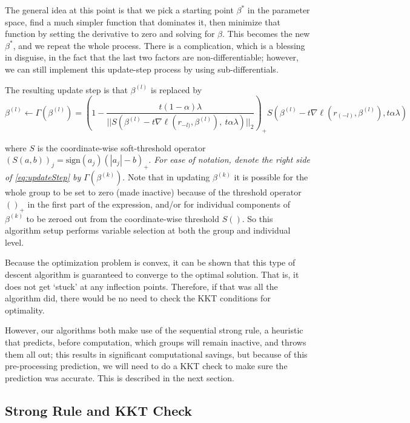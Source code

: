 \documentclass[titlepage]{article}
\begin{document}
The general idea at this point is that we pick a starting point $\beta^*$ in the parameter space, find a much simpler function that dominates it, then minimize that function by setting the derivative to zero and solving for $\beta$. This becomes the new $\beta^*$, and we repeat the whole process. There is a complication, which is a blessing in disguise, in the fact that the last two factors are non-differentiable; however, we can still implement this update-step process by using sub-differentials.



The resulting update step is that $\beta^{(l)}$ is replaced by
\begin{equation}
\beta^{(l)} \leftarrow \Gamma(\beta^{(l)}) =
\left(1-\frac{t(1-\alpha)\lambda}{||S(\beta^{(l)}-t\nabla \ell(r_{-l)},\beta^{(l)}),\ t\alpha\lambda)||_2}\right)_+ S(\beta^{(l)}-t\nabla \ell(r_{(-l)},\beta^{(l)}),t\alpha\lambda)
\label{eq:updateStep}
\end{equation}

where  $S$ is the coordinate-wise soft-threshold operator $(S(a,b))_j = \textrm{sign}(a_j)(|a_j|-b)_+$. \emph{For ease of notation, denote the right side of \autoref{eq:updateStep} by $\Gamma (\beta^{(k)})$}. Note that in updating $\beta^{(k)}$ it is possible for the whole group to be set to zero (made inactive) because of the threshold operator $()_+$ in the first part of the expression, and/or for individual components of $\beta^{(k)}$ to be zeroed out from the coordinate-wise threshold $S()$. So this algorithm setup performs variable selection at both the group and individual level.

Because the optimization problem is convex, it can be shown that this type of descent algorithm is guaranteed to converge to the optimal solution. That is, it does not get `stuck' at any inflection points. Therefore, if that was all the algorithm did, there would be no need to check the KKT conditions for optimality. 

However, our algorithms both make use of the sequential strong rule, a heuristic that predicts, before computation, which groups will remain inactive, and throws them all out; this results in significant computational savings, but because of this pre-processing prediction, we will need to do a KKT check \citep{boyd2004convex} to make sure the prediction was accurate. This is described in the next section.

\subsection{Strong Rule and KKT Check}
\end{document}
